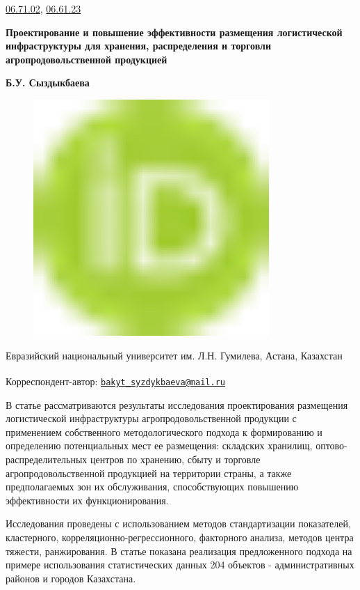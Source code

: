 \href{https://grnti.ru/?p1=06&p2=71&p3=02}{06.71.02},
\href{https://grnti.ru/?p1=06&p2=61&p3=23}{06.61.23}

{\bfseries Проектирование и повышение эффективности размещения
логистической инфраструктуры для хранения, распределения и торговли
агропродовольственной продукцией}

{\bfseries Б.У. Сыздыкбаева}

\begin{figure}[H]
	\centering
	\includegraphics[width=0.8\textwidth]{media/ekon/image1}
	\caption*{}
\end{figure}


Евразийский национальный университет им. Л.Н. Гумилева, Астана,
Казахстан

{\bfseries \textsuperscript{\envelope }}Корреспондент-автор:
\href{mailto:bakyt_syzdykbaeva@mail.ru}{\nolinkurl{bakyt\_syzdykbaeva@mail.ru}}

В статье рассматриваются результаты исследования проектирования
размещения логистической инфраструктуры агропродовольственной продукции
с применением собственного методологического подхода к формированию и
определению потенциальных мест ее размещения: складских хранилищ,
оптово-распределительных центров по хранению, сбыту и торговле
агропродовольственной продукцией на территории страны, а также
предполагаемых зон их обслуживания, способствующих повышению
эффективности их функционирования.

Исследования проведены с использованием методов стандартизации
показателей, кластерного, корреляционно-регрессионного, факторного
анализа, методов центра тяжести, ранжирования. В статье показана
реализация предложенного подхода на примере использования статистических
данных 204 объектов - административных районов и городов Казахстана.

